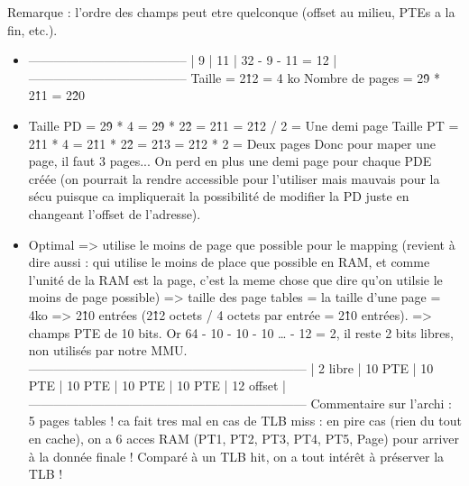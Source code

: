 \begin{correction}

Remarque : l'ordre des champs peut etre quelconque (offset au milieu, PTEs a la fin, etc.).
\begin{itemize}
  \item     --------------------------------------
  \newline |    9    |    11   | 32 - 9 - 11 = 12 |
  \newline  --------------------------------------
  \newline Taille = 2\^12 = 4 ko
  \newline Nombre de pages = 2\^9 * 2\^11 = 2\^20

  \item Taille PD = 2\^9 * 4 = 2\^9 * 2\^2 = 2\^11 = 2\^12 / 2 = Une demi page
  \newline Taille PT = 2\^11 * 4 = 2\^11 * 2\^2 = 2\^13 = 2\^12 * 2 = Deux pages
  \newline Donc pour maper une page, il faut 3 pages... On perd en plus une demi page pour chaque PDE cr\'e\'ee (on pourrait la rendre accessible pour l'utiliser mais mauvais pour la s\'ecu puisque ca impliquerait la possibilit\'e de modifier la PD juste en changeant l'offset de l'adresse).

  \item Optimal
  \newline => utilise le moins de page que possible pour le mapping (revient \`a dire aussi : qui utilise le moins de place que possible en RAM, et comme l'unit\'e de la RAM est la page, c'est la meme chose que dire qu'on utilsie le moins de page possible)
  \newline => taille des page tables = la taille d'une page = 4ko
  \newline => 2\^10 entr\'ees (2\^12 octets / 4 octets par entr\'ee = 2\^10 entr\'ees).
  \newline => champs PTE de 10 bits.
  \newline Or 64 - 10 - 10 - 10 … - 12 = 2, il reste 2 bits libres, non utilis\'es par notre MMU.
  \newline  ------------------------------------------------------------------
  \newline | 2 libre | 10 PTE | 10 PTE | 10 PTE | 10 PTE | 10 PTE | 12 offset |
  \newline  ------------------------------------------------------------------
  \newline Commentaire sur l'archi : 5 pages tables ! ca fait tres mal en cas de TLB miss : en pire cas (rien du tout en cache), on a 6 acces RAM (PT1, PT2, PT3, PT4, PT5, Page) pour arriver \`a la donn\'ee finale ! Compar\'e \`a un TLB hit, on a tout int\'erêt \`a pr\'eserver la TLB !
\end{itemize}

\end{correction}

